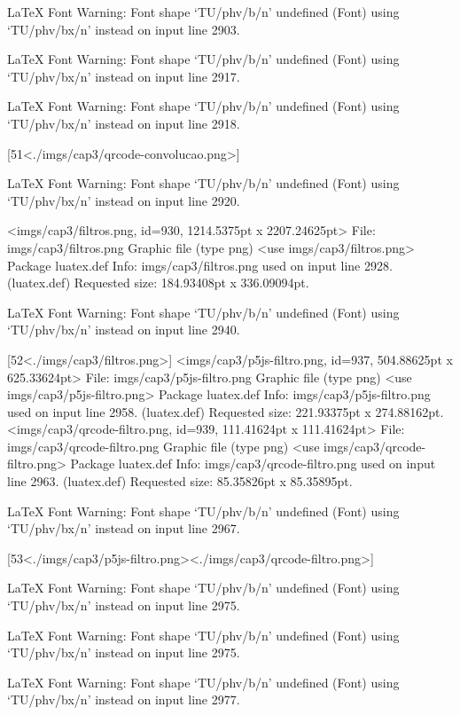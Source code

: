 LaTeX Font Warning: Font shape `TU/phv/b/n' undefined
(Font)              using `TU/phv/bx/n' instead on input line 2903.


LaTeX Font Warning: Font shape `TU/phv/b/n' undefined
(Font)              using `TU/phv/bx/n' instead on input line 2917.


LaTeX Font Warning: Font shape `TU/phv/b/n' undefined
(Font)              using `TU/phv/bx/n' instead on input line 2918.

[51<./imgs/cap3/qrcode-convolucao.png>]

LaTeX Font Warning: Font shape `TU/phv/b/n' undefined
(Font)              using `TU/phv/bx/n' instead on input line 2920.

<imgs/cap3/filtros.png, id=930, 1214.5375pt x 2207.24625pt>
File: imgs/cap3/filtros.png Graphic file (type png)
<use imgs/cap3/filtros.png>
Package luatex.def Info: imgs/cap3/filtros.png  used on input line 2928.
(luatex.def)             Requested size: 184.93408pt x 336.09094pt.

LaTeX Font Warning: Font shape `TU/phv/b/n' undefined
(Font)              using `TU/phv/bx/n' instead on input line 2940.

[52<./imgs/cap3/filtros.png>]
<imgs/cap3/p5js-filtro.png, id=937, 504.88625pt x 625.33624pt>
File: imgs/cap3/p5js-filtro.png Graphic file (type png)
<use imgs/cap3/p5js-filtro.png>
Package luatex.def Info: imgs/cap3/p5js-filtro.png  used on input line 2958.
(luatex.def)             Requested size: 221.93375pt x 274.88162pt.
<imgs/cap3/qrcode-filtro.png, id=939, 111.41624pt x 111.41624pt>
File: imgs/cap3/qrcode-filtro.png Graphic file (type png)
<use imgs/cap3/qrcode-filtro.png>
Package luatex.def Info: imgs/cap3/qrcode-filtro.png  used on input line 2963.
(luatex.def)             Requested size: 85.35826pt x 85.35895pt.

LaTeX Font Warning: Font shape `TU/phv/b/n' undefined
(Font)              using `TU/phv/bx/n' instead on input line 2967.

[53<./imgs/cap3/p5js-filtro.png><./imgs/cap3/qrcode-filtro.png>]

LaTeX Font Warning: Font shape `TU/phv/b/n' undefined
(Font)              using `TU/phv/bx/n' instead on input line 2975.


LaTeX Font Warning: Font shape `TU/phv/b/n' undefined
(Font)              using `TU/phv/bx/n' instead on input line 2975.


LaTeX Font Warning: Font shape `TU/phv/b/n' undefined
(Font)              using `TU/phv/bx/n' instead on input line 2977.


